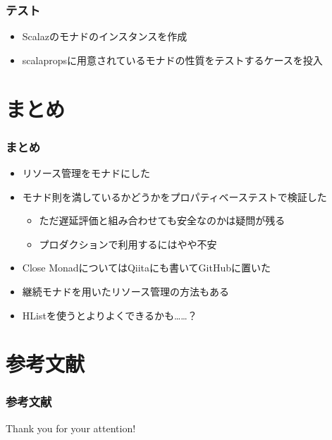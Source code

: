 \begin{frame}
  \frametitle{テスト}

  

  \begin{itemize}
    \item<2-> Scalazのモナドのインスタンスを作成
    \item<3-> scalapropsに用意されているモナドの性質をテストするケースを投入
  \end{itemize}
\end{frame}

\section{まとめ}

\begin{frame}
  \frametitle{まとめ}

  \begin{itemize}
    \item<2-> リソース管理をモナドにした
    \item<3-> モナド則を満しているかどうかをプロパティベーステストで検証した
    \begin{itemize}
      \item<4-> ただ遅延評価と組み合わせても安全なのかは疑問が残る
      \item<5-> プロダクションで利用するにはやや不安
    \end{itemize}
    \item<6-> Close MonadについてはQiitaにも書いてGitHubに置いた\cite{closemonad,closemonadgithub}
    \item<7-> 継続モナドを用いたリソース管理の方法もある\cite{tanakh2015}
    \item<8-> HList\cite{Kiselyov2004,hlist}を使うとよりよくできるかも……？
  \end{itemize}
\end{frame}

\section*{参考文献}
\begin{frame}[allowframebreaks]
  \frametitle{参考文献}

  
  \nocite{*}

  
\end{frame}

\begin{frame}
  \centering
  {\Huge Thank you for your attention!}
\end{frame}


